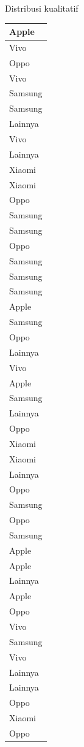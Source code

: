 \documentclass[
  ignorenonframetext,
]{beamer}
\begin{document}
\begin{frame}[s]{Distribusi kualitatif}
\begin{table}
\begin{tabular}[t]{l}
\hline
Apple\\
\hline
Vivo\\
\hline
Oppo\\
\hline
Vivo\\
\hline
Samsung\\
\hline
Samsung\\
\hline
Lainnya\\
\hline
Vivo\\
\hline
Lainnya\\
\hline
Xiaomi\\
\hline
Xiaomi\\
\hline
Oppo\\
\hline
Samsung\\
\hline
Samsung\\
\hline
Oppo\\
\hline
Samsung\\
\hline
Samsung\\
\hline
Samsung\\
\hline
Apple\\
\hline
Samsung\\
\hline
Oppo\\
\hline
Lainnya\\
\hline
Vivo\\
\hline
Apple\\
\hline
Samsung\\
\hline
Lainnya\\
\hline
Oppo\\
\hline
Xiaomi\\
\hline
Xiaomi\\
\hline
Lainnya\\
\hline
Oppo\\
\hline
Samsung\\
\hline
Oppo\\
\hline
Samsung\\
\hline
Apple\\
\hline
Apple\\
\hline
Lainnya\\
\hline
Apple\\
\hline
Oppo\\
\hline
Vivo\\
\hline
Samsung\\
\hline
Vivo\\
\hline
Lainnya\\
\hline
Lainnya\\
\hline
Oppo\\
\hline
Xiaomi\\
\hline
Oppo\\

\end{tabular}
\end{table}
\end{frame}
\end{document}
